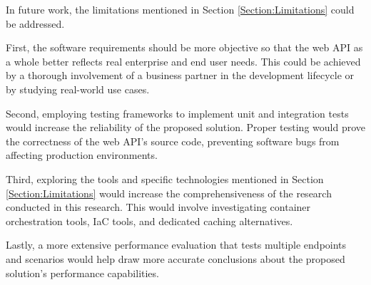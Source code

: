 \documentclass[12pt, reqno, oneside]{amsbook}
\theoremstyle{definition}
\theoremstyle{definition}
\numberwithin{section}{chapter}
\numberwithin{table}{chapter}
\numberwithin{figure}{chapter}
\begin{document}
In future work, the limitations mentioned in Section \ref{Section:Limitations} could be addressed.

First, the software requirements should be more objective so that the web \ac{API} as a whole better reflects real enterprise and end user needs. This could be achieved by a thorough involvement of a business partner in the development lifecycle or by studying real-world use cases.

Second, employing testing frameworks to implement unit and integration tests would increase the reliability of the proposed solution. Proper testing would prove the correctness of the web \ac{API}'s source code, preventing software bugs from affecting production environments.

Third, exploring the tools and specific technologies mentioned in Section \ref{Section:Limitations} would increase the comprehensiveness of the research conducted in this research. This would involve investigating container orchestration tools, \ac{IaC} tools, and dedicated caching alternatives.

Lastly, a more extensive performance evaluation that tests multiple endpoints and scenarios would help draw more accurate conclusions about the proposed solution's performance capabilities.

\printbibliography[title={References}]
\end{document}

